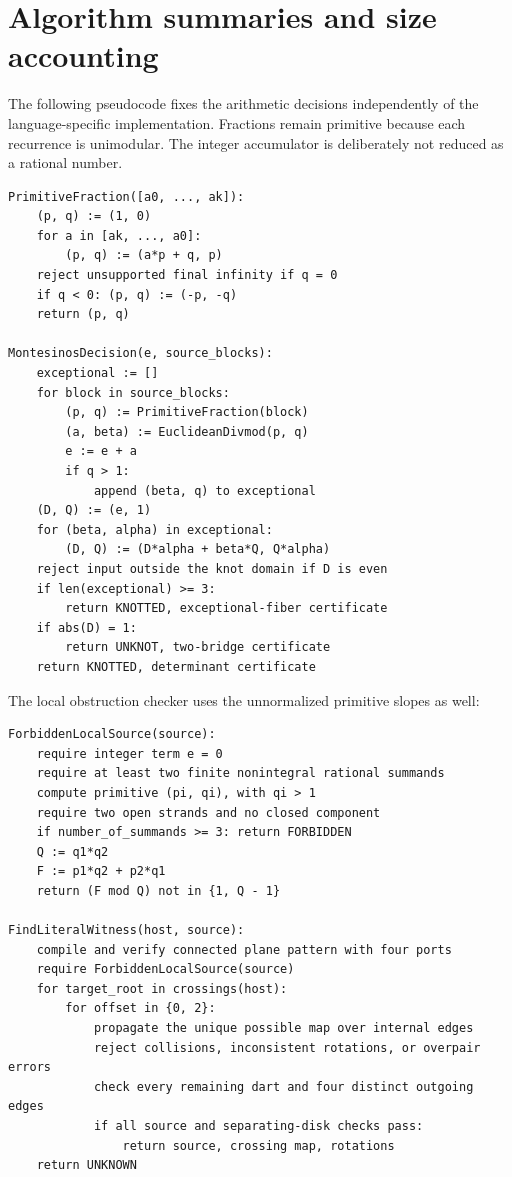 \appendix
\section{Algorithm summaries and size accounting}
\label{sec:appendix}

The following pseudocode fixes the arithmetic decisions independently of
the language-specific implementation. Fractions remain primitive because
each recurrence is unimodular. The integer accumulator is deliberately
not reduced as a rational number.

\begin{lstlisting}
PrimitiveFraction([a0, ..., ak]):
    (p, q) := (1, 0)
    for a in [ak, ..., a0]:
        (p, q) := (a*p + q, p)
    reject unsupported final infinity if q = 0
    if q < 0: (p, q) := (-p, -q)
    return (p, q)

MontesinosDecision(e, source_blocks):
    exceptional := []
    for block in source_blocks:
        (p, q) := PrimitiveFraction(block)
        (a, beta) := EuclideanDivmod(p, q)
        e := e + a
        if q > 1:
            append (beta, q) to exceptional
    (D, Q) := (e, 1)
    for (beta, alpha) in exceptional:
        (D, Q) := (D*alpha + beta*Q, Q*alpha)
    reject input outside the knot domain if D is even
    if len(exceptional) >= 3:
        return KNOTTED, exceptional-fiber certificate
    if abs(D) = 1:
        return UNKNOT, two-bridge certificate
    return KNOTTED, determinant certificate
\end{lstlisting}

The local obstruction checker uses the unnormalized primitive slopes as
well:
\begin{lstlisting}
ForbiddenLocalSource(source):
    require integer term e = 0
    require at least two finite nonintegral rational summands
    compute primitive (pi, qi), with qi > 1
    require two open strands and no closed component
    if number_of_summands >= 3: return FORBIDDEN
    Q := q1*q2
    F := p1*q2 + p2*q1
    return (F mod Q) not in {1, Q - 1}

FindLiteralWitness(host, source):
    compile and verify connected plane pattern with four ports
    require ForbiddenLocalSource(source)
    for target_root in crossings(host):
        for offset in {0, 2}:
            propagate the unique possible map over internal edges
            reject collisions, inconsistent rotations, or overpair errors
            check every remaining dart and four distinct outgoing edges
            if all source and separating-disk checks pass:
                return source, crossing map, rotations
    return UNKNOWN
\end{lstlisting}

